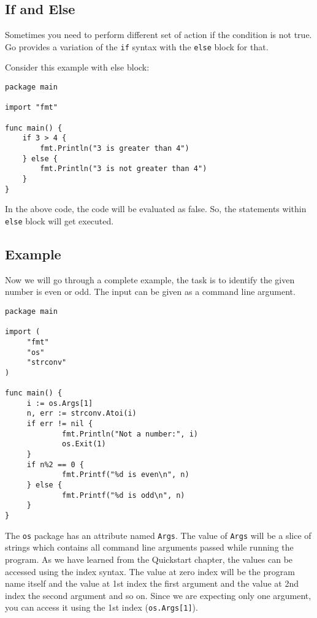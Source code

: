 \subsection{If and Else}

Sometimes you need to perform different set of action if the condition
is not true.  Go provides a variation of the \texttt{if} syntax with
the \texttt{else} block for that.

Consider this example with else block:

\begin{lstlisting}[caption=If with else block]
package main

import "fmt"

func main() {
    if 3 > 4 {
        fmt.Println("3 is greater than 4")
    } else {
        fmt.Println("3 is not greater than 4")
    }
}
\end{lstlisting}

In the above code, the code will be evaluated as false.  So, the
statements within \texttt{else} block will get executed.

\subsection{Example}

Now we will go through a complete example, the task is to identify the
given number is even or odd.  The input can be given as a command line
argument.

\begin{lstlisting}[caption=If with else example]
package main

import (
     "fmt"
     "os"
     "strconv"
)

func main() {
     i := os.Args[1]
     n, err := strconv.Atoi(i)
     if err != nil {
             fmt.Println("Not a number:", i)
             os.Exit(1)
     }
     if n%2 == 0 {
             fmt.Printf("%d is even\n", n)
     } else {
             fmt.Printf("%d is odd\n", n)
     }
}
\end{lstlisting}

The \texttt{os} package has an attribute named \texttt{Args}.  The
value of \texttt{Args} will be a slice of strings which contains all
command line arguments passed while running the program.  As we have
learned from the Quickstart chapter, the values can be accessed using
the index syntax.  The value at zero index will be the program name
itself and the value at 1st index the first argument and the value at
2nd index the second argument and so on.  Since we are expecting only
one argument, you can access it using the 1st index
(\texttt{os.Args[1]}).

